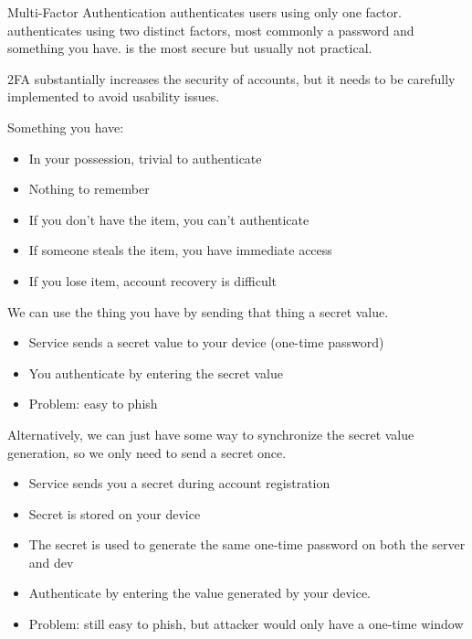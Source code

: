 \documentclass[12pt]{report}
\begin{document}
\begin{dfnbox}{Multi-Factor Authentication}{}
     authenticates users using only one factor.  authenticates using two distinct factors, most commonly a password and something you have.  is the most secure but usually not practical.
\end{dfnbox}

2FA substantially increases the security of accounts, but it needs to be carefully implemented to avoid usability issues.

Something you have:
\begin{itemize}[noitemsep]
    \item In your possession, trivial to authenticate
    \item Nothing to remember
    \item If you don't have the item, you can't authenticate
    \item If someone steals the item, you have immediate access
    \item If you lose item, account recovery is difficult
\end{itemize}

We can use the thing you have by sending that thing a secret value.
\begin{itemize}[noitemsep]
    \item Service sends a secret value to your device (one-time password)
    \item You authenticate by entering the secret value
    \item Problem: easy to phish
\end{itemize}

Alternatively, we can just have some way to synchronize the secret value generation, so we only need to send a secret once.
\begin{itemize}[noitemsep]
    \item Service sends you a secret during account registration
    \item Secret is stored on your device
    \item The secret is used to generate the same one-time password on both the server and dev
    \item Authenticate by entering the value generated by your device.
    \item Problem: still easy to phish, but attacker would only have a one-time window
\end{itemize}
\end{document}
